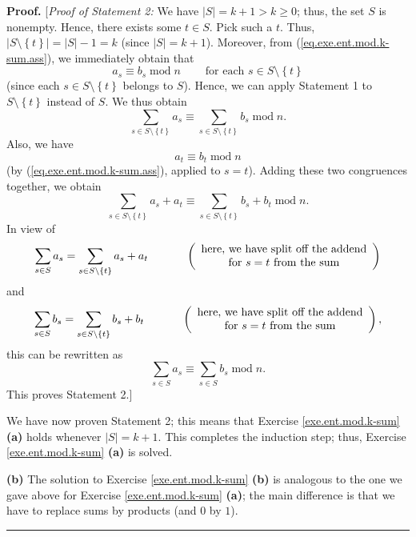 \documentclass[numbers=enddot,12pt,final,onecolumn,notitlepage]{scrartcl}%
\numberwithin{exer}{subsection}
\theoremstyle{definition}
\newenvironment{fineprint}{\begin{small}}{\end{small}}
\newenvironment{proof}[1][Proof]{\noindent\textbf{#1.} }{\ \rule{0.5em}{0.5em}}
\let\sumnonlimits\sum
\renewcommand{\sum}{\sumnonlimits\limits}
\begin{document}
\begin{fineprint}
\begin{proof}
[\textit{Proof of Statement 2:} We have $\left\vert S\right\vert =k+1>k\geq0$;
thus, the set $S$ is nonempty. Hence, there exists some $t\in S$. Pick such a
$t$. Thus, $\left\vert S\setminus\left\{  t\right\}  \right\vert =\left\vert
S\right\vert -1=k$ (since $\left\vert S\right\vert =k+1$). Moreover, from
(\ref{eq.exe.ent.mod.k-sum.ass}), we immediately obtain that
\[
a_{s}\equiv b_{s}\operatorname{mod}n\ \ \ \ \ \ \ \ \ \ \text{for each }s\in
S\setminus\left\{  t\right\}
\]
(since each $s\in S\setminus\left\{  t\right\}  $ belongs to $S$). Hence, we
can apply Statement 1 to $S\setminus\left\{  t\right\}  $ instead of $S$. We
thus obtain
\[
\sum_{s\in S\setminus\left\{  t\right\}  }a_{s}\equiv\sum_{s\in S\setminus
\left\{  t\right\}  }b_{s}\operatorname{mod}n.
\]
Also, we have
\[
a_{t}\equiv b_{t}\operatorname{mod}n
\]
(by (\ref{eq.exe.ent.mod.k-sum.ass}), applied to $s=t$). Adding these two
congruences together, we obtain%
\[
\sum_{s\in S\setminus\left\{  t\right\}  }a_{s}+a_{t}\equiv\sum_{s\in
S\setminus\left\{  t\right\}  }b_{s}+b_{t}\operatorname{mod}n.
\]
In view of%
\[
\sum_{s\in S}a_{s}=\sum_{s\in S\setminus\left\{  t\right\}  }a_{s}%
+a_{t}\ \ \ \ \ \ \ \ \ \ \left(
\begin{array}
[c]{c}%
\text{here, we have split off the addend}\\
\text{for }s=t\text{ from the sum}%
\end{array}
\right)
\]
and%
\[
\sum_{s\in S}b_{s}=\sum_{s\in S\setminus\left\{  t\right\}  }b_{s}%
+b_{t}\ \ \ \ \ \ \ \ \ \ \left(
\begin{array}
[c]{c}%
\text{here, we have split off the addend}\\
\text{for }s=t\text{ from the sum}%
\end{array}
\right)  ,
\]
this can be rewritten as%
\[
\sum_{s\in S}a_{s}\equiv\sum_{s\in S}b_{s}\operatorname{mod}n.
\]
This proves Statement 2.]

We have now proven Statement 2; this means that Exercise
\ref{exe.ent.mod.k-sum} \textbf{(a)} holds whenever $\left\vert S\right\vert
=k+1$. This completes the induction step; thus, Exercise
\ref{exe.ent.mod.k-sum} \textbf{(a)} is solved.

\textbf{(b)} The solution to Exercise \ref{exe.ent.mod.k-sum} \textbf{(b)} is
analogous to the one we gave above for Exercise \ref{exe.ent.mod.k-sum}
\textbf{(a)}; the main difference is that we have to replace sums by products
(and $0$ by $1$).
\end{proof}
\end{fineprint}
\end{document}
